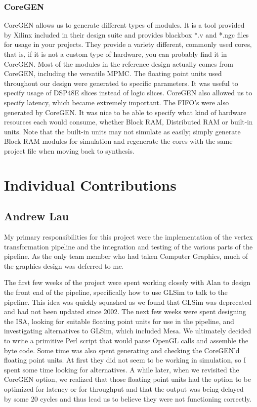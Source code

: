 \documentclass[letterpaper,10pt]{article}
\begin{document}
\subsubsection{CoreGEN}
CoreGEN allows us to generate different types of modules.  It is a tool provided by Xilinx included in their design suite and provides blackbox *.v and *.ngc files for usage in your projects.  They provide a variety different, commonly used cores, that is, if it is not a custom type of hardware, you can probably find it in CoreGEN.  Most of the modules in the reference design actually comes from CoreGEN, including the versatile MPMC.  The floating point units used throughout our design were generated to specific parameters.  It was useful to specify usage of DSP48E slices instead of logic slices.  CoreGEN also allowed us to specify latency, which became extremely important.  The FIFO's were also generated by CoreGEN.  It was nice to be able to specify what kind of hardware resources each would consume, whether Block RAM, Distributed RAM or built-in units.  Note that the built-in units may not simulate as easily; simply generate Block RAM modules for simulation and regenerate the cores with the same project file when moving back to synthesis.


\section{Individual Contributions}
\subsection{Andrew Lau}
My primary responsibilities for this project were the implementation of the vertex transformation pipeline and the integration and testing of the various parts of the pipeline. As the only team member who had taken Computer Graphics, much of the graphics design was deferred to me. 

The first few weeks of the project were spent working closely with Alan to design the front end of the pipeline, specifically how to use GLSim to talk to the pipeline. This idea was quickly squashed as we found that GLSim was deprecated and had not been updated since 2002. The next few weeks were spent designing the ISA, looking for suitable floating point units for use in the pipeline, and investigating alternatives to GLSim, which included Mesa. We ultimately decided to write a primitive Perl script that would parse OpenGL calls and assemble the byte code. Some time was also spent generating and checking the CoreGEN'd floating point units. At first they did not seem to be working in simulation, so I spent some time looking for alternatives. A while later, when we revisited the CoreGEN option, we realized that those floating point units had the option to be optimized for latency or for throughput and that the output was being delayed by some 20 cycles and thus lead us to believe they were not functioning correctly.
\end{document}
